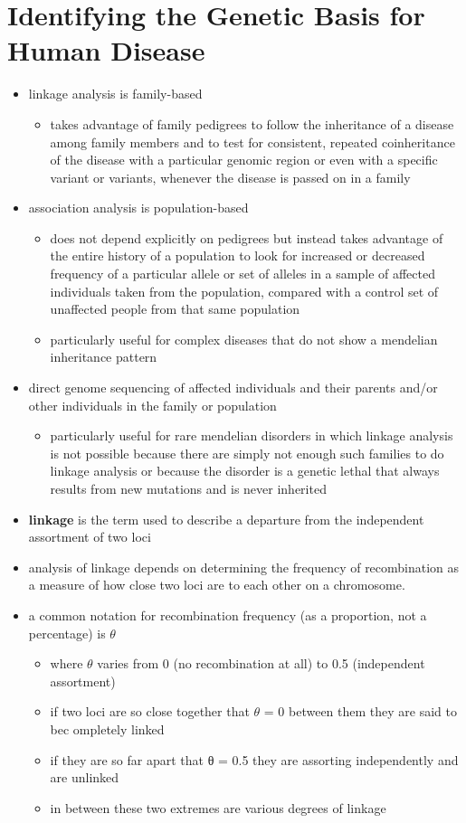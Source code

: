 \documentclass[12pt]{scrartcl}
\begin{document}
\section{Identifying the Genetic Basis for Human Disease}
\label{sec:org888f224}
\begin{itemize}
\item linkage analysis is family-based
\begin{itemize}
\item takes advantage of family pedigrees to follow the inheritance of a
disease among family members and to test for consistent, repeated
coinheritance of the disease with a particular genomic region or
even with a specific variant or variants, whenever the disease is
passed on in a family
\end{itemize}
\item association analysis is population-based
\begin{itemize}
\item does not depend explicitly on pedigrees but instead takes
advantage of the entire history of a population to look for
increased or decreased frequency of a particular allele or set of
alleles in a sample of affected individuals taken from the
population, compared with a control set of unaffected people from
that same population
\item particularly useful for complex diseases that do not show a
mendelian inheritance pattern
\end{itemize}
\item direct genome sequencing of affected individuals and their parents
and/or other individuals in the family or population
\begin{itemize}
\item particularly useful for rare mendelian disorders in which linkage
analysis is not possible because there are simply not enough such
families to do linkage analysis or because the disorder is a
genetic lethal that always results from new mutations and is
never inherited
\end{itemize}

\item \textbf{linkage} is the term used to describe a departure from the
independent assortment of two loci
\item analysis of linkage depends on determining the frequency of
recombination as a measure of how close two loci are to each other
on a chromosome.
\item a common notation for recombination frequency (as a proportion, not
a percentage) is \(\theta\)
\begin{itemize}
\item where \(\theta\) varies from 0 (no recombination at all) to 0.5 (independent assortment)
\item if two loci are so close together that \(\theta\) = 0 between them they are said to bec ompletely linked
\item if they are so far apart that θ = 0.5 they are assorting independently and are unlinked
\item in between these two extremes are various degrees of linkage
\end{itemize}


\end{itemize}
\end{document}
